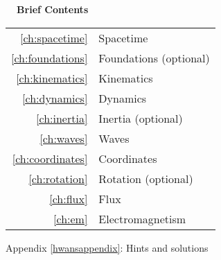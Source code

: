 \documentclass{sr}
\begin{document}


\cleardoublepage





\pagebreak\vspace{100mm}

\hbox{}\noindent\huge\bfseries\sffamily{}\hspace{-2mm}\ \ Brief Contents\\
\hspace{-20mm}\noindent\mynormaltype\Large\sffamily{}\begin{tabular}{rl}
\ref{ch:spacetime} & Spacetime \quad \pageref{ch:spacetime}\\
\ref{ch:foundations} & Foundations (optional) \quad \pageref{ch:foundations}\\
\ref{ch:kinematics} & Kinematics \quad \pageref{ch:kinematics}\\
\ref{ch:dynamics} & Dynamics \quad \pageref{ch:dynamics}\\
\ref{ch:inertia} & Inertia (optional) \quad \pageref{ch:inertia}\\
\ref{ch:waves} & Waves \quad \pageref{ch:waves}\\
\ref{ch:coordinates} & Coordinates \quad \pageref{ch:coordinates}\\
\ref{ch:rotation} & Rotation (optional) \quad \pageref{ch:rotation}\\
\ref{ch:flux} & Flux \quad \pageref{ch:flux}\\
\ref{ch:em} & Electromagnetism \quad \pageref{ch:em}\\
\end{tabular}
\mynormaltype

\vspace{100mm}\pagebreak

\cleardoublepage

\mynormaltype

\tableofcontents

{\sffamily{} Appendix \ref{hwansappendix}: Hints and solutions                      \dotfill \pageref{hwansappendix}}

\mainmatter
  \addtocounter{page}{10} 
\parafmt
\myeqnspacing %
	\renewcommand{\chapdir}{ch01}
	\renewcommand{\chapdir}{ch02}
	\renewcommand{\chapdir}{ch03}
	\renewcommand{\chapdir}{ch04}
	\renewcommand{\chapdir}{ch05}
	\renewcommand{\chapdir}{ch06}
	\renewcommand{\chapdir}{ch07}
	\renewcommand{\chapdir}{ch08}
	\renewcommand{\chapdir}{ch09}
	\formatchtoc{\large}{\quad\contentspage}{4mm} %
	\renewcommand{\chapdir}{ch10}
\end{document}
